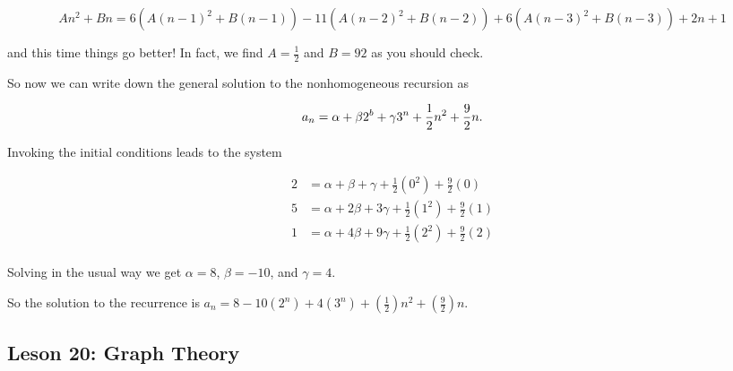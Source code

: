 \documentclass[11pt]{amsart}
\begin{document}
\begin{enumerate}
\[
An^2+Bn=6(A(n-1)^2+B(n-1))-11(A(n-2)^2+B(n-2))+6(A(n-3)^2+B(n-3))+2n+1
\]

and this time things go better! In fact, we find $\displaystyle A = \frac{1}{2}$ and $\displaystyle B= {9}{2}$
as you should check.

So now we can write down the general solution to the nonhomogeneous recursion as

\[
a_n = \alpha + \beta2^b + \gamma3^n + {1\over2}n^2 +{9\over 2}n.
\]

Invoking the initial conditions leads to the system

\begin{align*}
2 & = \alpha + \beta + \gamma + \frac{1}{2}(0^2) + \frac{9}{2}(0)\\[5pt]
5 & = \alpha + 2\beta + 3\gamma + \frac{1}{2}(1^2) +\frac{9}{2}(1)\\[5pt]
1 & = \alpha + 4\beta + 9\gamma + \frac{1}{2}(2^2) + \frac{9}{2}(2)\\[5pt]
\end{align*}

Solving in the usual way we get $\alpha = 8$, $\beta = -10$, and $\gamma = 4$.

So the solution to the recurrence is 
$\displaystyle a_n =  8 - 10(2^n) + 4(3^n) + \left(\frac{1}{2}\right)n^2 + \left(\frac{9}{2}\right)n$.

\end{enumerate}

\subsection{Leson 20: Graph Theory}
\end{document}
